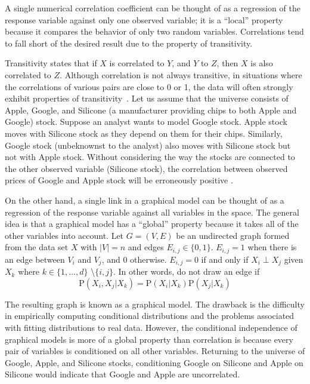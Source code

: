 A single numerical correlation coefficient can be 
thought of as a regression of the response variable
against only one observed variable; it is a ``local'' property because it
compares the behavior of only two random variables. Correlations tend to fall 
short of the desired result due to the property of transitivity.

Transitivity states that if $X$ is correlated to $Y$, and $Y$ to $Z$,
then $X$ is also correlated to $Z$. Although correlation is not always
transitive, in situations where the correlations of various pairs are close to 
0 or 1, the data will often strongly exhibit properties of 
transitivity~\cite{tao2014}. Let us assume that the universe consists of Apple, 
Google, and Silicone (a manufacturer providing chips to both Apple and Google) 
stock. Suppose an analyst wants to model Google stock. 
Apple stock moves with Silicone stock as they
depend on them for their chips. Similarly, Google stock (unbeknownst to the
analyst) also moves with Silicone stock but not with Apple stock. Without 
considering the way the stocks are connected to the other observed variable 
(Silicone stock), the correlation between observed prices of Google and Apple 
stock will be erroneously positive .

On the other hand, a single link in a graphical model can be thought of as a 
regression of the response variable against all variables in the space. The 
general idea is that a graphical model has a ``global'' property because it 
takes all of the other variables into account. Let $G=(V,E)$ be an
undirected graph formed from the data set $X$ with $|V| =  n$ and edges 
$E_{i,j}\in\{0,1\}$. $E_{i,j}=1$ when there is an edge between $V_i$ and $V_j$, 
and 0 otherwise. $E_{i,j}=0$ if and only if $X_i \perp X_j$ given $X_k$ where
$k\in\{1,...,d\}$ \textbackslash $\{i,j\}$. In other words, do not draw an edge
if
$$\text{P}(X_i,X_j|X_k)=\text{P}(X_i|X_k)\text{P}(X_j|X_k)$$

The resulting graph is known as a graphical model. The drawback is the 
difficulty in empirically computing conditional distributions and the problems 
associated with fitting distributions to real data. 
However, the conditional independence of graphical models is more of a global 
property than correlation is because every pair of variables is conditioned on 
all other variables. Returning to the universe of Google, Apple, and Silicone 
stocks, conditioning Google on Silicone and Apple on Silicone would indicate 
that Google and Apple are uncorrelated. 

